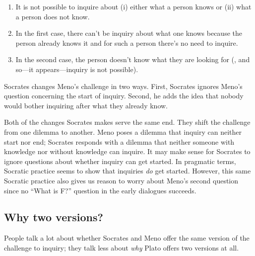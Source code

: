 \begin{enumerate}
    \item It is not possible to inquire about (i) either what a person knows or (ii) what a person does not know.
    \item In the first case, there can't be inquiry about what one knows because the person already knows it and for such a person there's no need to inquire.
    \item In the second case, the person doesn't know what they are looking for (, and so—it appears—inquiry is not possible).
\end{enumerate}
Socrates changes Meno's challenge in two ways. First, Socrates ignores Meno's question concerning the start of inquiry. Second, he adds the idea that nobody would bother inquiring after what they already know.

Both of the changes Socrates makes serve the same end. They shift the challenge from one dilemma to another. Meno poses a dilemma that inquiry can neither start nor end; Socrates responds with a dilemma that neither someone with knowledge nor without knowledge can inquire. It may make sense for Socrates to ignore questions about whether inquiry can get started. In pragmatic terms, Socratic practice seems to show that inquiries \textit{do} get started. However, this same Socratic practice also gives us reason to worry about Meno's second question since no ``What is F?'' question in the early dialogues succeeds.

\subsection{Why two versions?}

People talk a lot about whether Socrates and Meno offer the same version of the challenge to inquiry; they talk less about \textit{why} Plato offers two versions at all.

